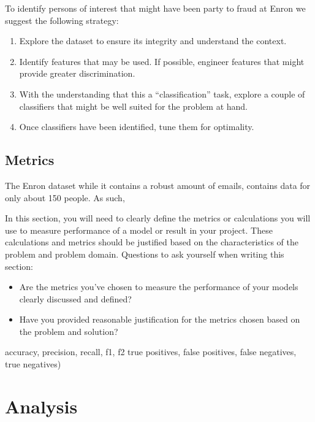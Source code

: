 \documentclass[twoside,openright,titlepage,numbers=noenddot,headinclude,%
               footinclude=true,cleardoublepage=empty,abstractoff,BCOR=5mm,%
               paper=a4,fontsize=11pt,ngerman,american]{scrreprt}
\numberwithin{theorem}{chapter}
\numberwithin{definition}{chapter}
\numberwithin{algorithm}{chapter}
\numberwithin{figure}{chapter}
\numberwithin{table}{chapter}
\numberwithin{equation}{chapter}
\begin{document}
To identify persons of interest that might have been party to fraud at Enron we suggest the following strategy:
\begin{enumerate}%
\item Explore the dataset to ensure its integrity and understand the context.
\item Identify features that may be used. If possible, engineer features that might provide greater discrimination.
\item With the understanding that this a ``classification'' task, explore a couple of classifiers that might be well suited for the problem at hand.
\item Once classifiers have been identified, tune them for optimality.
\end{enumerate}



\section*{Metrics}

The Enron dataset while it contains a robust amount of emails, contains data for only about 150 people. As such, 

In this section, you will need to clearly define the metrics or calculations you will use to measure performance of a model or result in your project. These calculations and metrics should be justified based on the characteristics of the problem and problem domain. Questions to ask yourself when writing this section:
\begin{itemize}%
\item Are the metrics you've chosen to measure the performance of your models clearly discussed and defined?
\item Have you provided reasonable justification for the metrics chosen based on the problem and solution?
\end{itemize}

accuracy, precision, recall, f1, f2
true positives, false positives, false negatives, true negatives)


\chapter*{Analysis}
\end{document}
